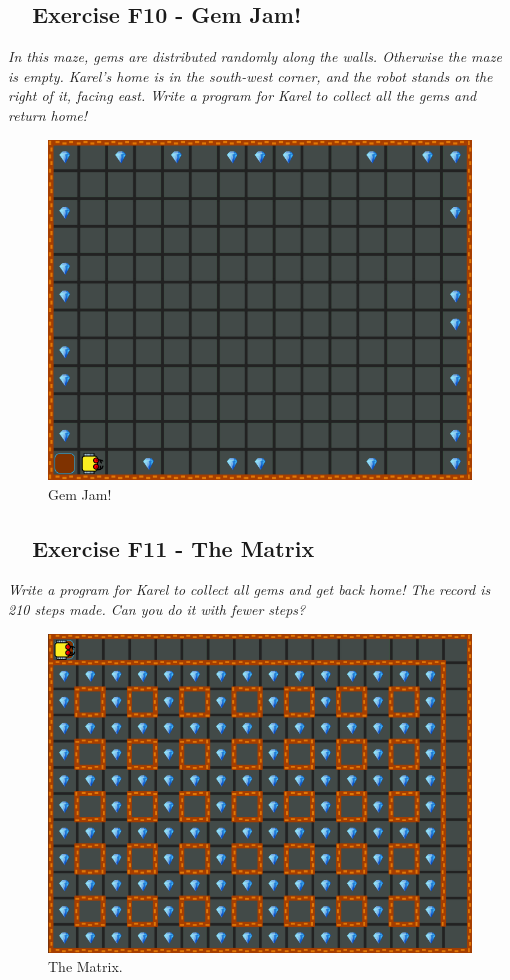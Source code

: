 \documentclass[article,A4,12pt]{llncs}
\begin{document}
{{{{\subsection{\ \ Exercise F10 - Gem Jam!}

{\em In this maze, gems are distributed randomly along the walls. Otherwise 
the maze is empty. Karel's home is in the south-west corner, and the robot 
stands on the right of it, facing east. Write a program for Karel to collect 
all the gems and return home!}\\[-7mm]

\begin{figure}[!ht]
\begin{center}
\includegraphics[height=0.4\textwidth]{img/f10.png}
\end{center}
\vspace{-4mm}
\caption{Gem Jam!}
\label{fig:f10}
\vspace{-10mm}
\end{figure}
\noindent

\newpage

\subsection{\ \ Exercise F11 - The Matrix}

{\em Write a program for Karel to collect all gems and get back home! The record is 
210 steps made. Can you do it with fewer steps?}\\[-7mm]

\begin{figure}[!ht]
\begin{center}
\includegraphics[height=0.4\textwidth]{img/f11.png}
\end{center}
\vspace{-4mm}
\caption{The Matrix.}
\label{fig:f11}
\vspace{-10mm}
\end{figure}
\noindent

}}}}
\end{document}
